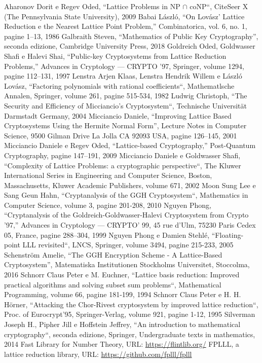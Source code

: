 \documentclass[a4paper,12pt]{report}
\theoremstyle{definition}
\begin{document}
\begin{thebibliography}{}
    Aharonov Dorit e Regev Oded, “Lattice Problems in NP $\cap$ coNP“, 
    CiteSeer X (The Pennsylvania State University), 2009
    Babai László, “On Lovász’ Lattice Reduction e the Nearest Lattice Point Problem,” 
    Combinatorica, vol. 6, no. 1, pagine 1–13, 1986
    Galbraith Steven, “Mathematics of Public Key Cryptography”, seconda edizione, 
    Cambridge University Press, 2018
    Goldreich Oded, Goldwasser Shafi e Halevi Shai,  “Public-key Cryptosystems from 
    Lattice Reduction Problems,” Advances in Cryptology — CRYPTO ’97, Springer, volume 1294, 
    pagine 112–131, 1997
    Lenstra Arjen Klaas, Lenstra Hendrik Willem e László Lovász, 
    “Factoring polynomials with rational coefficients“, Mathematlsche Annalen, Springer, 
    volume 261, pagine 515-534, 1982
    Ludwig Christoph, “The Security and Efficiency of Micciancio’s
    Cryptosystem“, Technische Universität Darmstadt Germany, 2004
    Micciancio Daniele,  “Improving Lattice Based Cryptosystems Using the Hermite 
    Normal Form”, Lecture Notes in Computer Science, 9500 Gilman Drive La Jolla 
    CA 92093 USA, pagine 126–145, 2001
    Micciancio Daniele e Regev Oded, “Lattice-based Cryptography,” Post-Quantum 
    Cryptography, pagine 147–191, 2009
    Micciancio Daniele e Goldwasser Shafi, 
    “Complexity of Lattice Problems: a cryptographic perspective“,
    The Kluwer International Series in Engineering and Computer Science, Boston, Massachusetts,
    Kluwer Academic Publishers, volume 671, 2002
    Moon Sung Lee e Sang Geun Hahn, “Cryptanalysis of the GGH Cryptosystem“,
    Mathematics in Computer Science, volume 3, pagine 201-208, 2010
    Nguyen Phong, “Cryptanalysis of the Goldreich-Goldwasser-Halevi Cryptosystem from 
    Crypto ’97,” Advances in Cryptology — CRYPTO’ 99, 45 rue d’Ulm, 75230 Paris Cedex 05, 
    France, pagine 288–304, 1999
    Nguyen Phong e Damien Stehlé, “Floating-point LLL revisited“, LNCS, Springer, 
    volume 3494, pagine 215-233, 2005
    Schenström Amelie, “The GGH Encryption Scheme - A Lattice-Based Cryptosystem”, 
    Matematiska Institutionen Stockholms Universitet, Stoccolma, 2016
    Schnorr Claus Peter e M. Euchner, 
    “Lattice basis reduction: Improved practical algorithms and solving subset sum problems“,
    Mathematical Programming, volume 66, pagine 181-199, 1994
    Schnorr Claus Peter e H. H. Hörner, 
    “Attacking the Chor-Rivest cryptosystem by improved lattice reduction“,
    Proc. of Eurocrypt'95, Springer-Verlag, volume 921, pagine 1-12, 1995
    Silverman Joseph H., Pipher Jill e Hoffstein Jeffrey, “An introduction to mathematical cryptography“,
    seconda edizione, Springer, Undergraduate texts in mathematics, 2014
    Fast Library for Number Theory, URL: \url{https://flintlib.org/}
    FPLLL, a lattice reduction library, URL: \url{https://github.com/fplll/fplll}
   
\end{thebibliography}
% 
\end{document}

